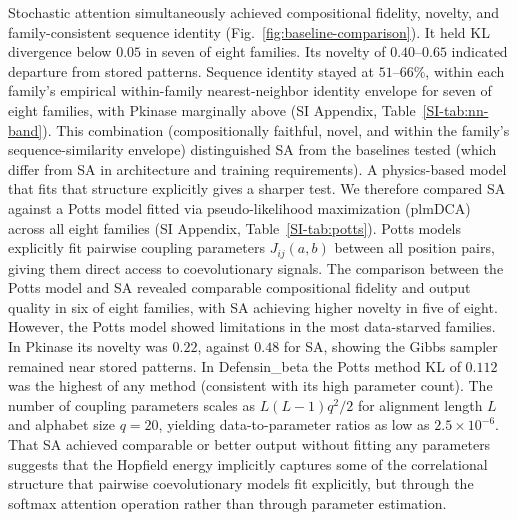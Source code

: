 \documentclass[11pt,onecolumn,twoside,lineno]{pnas-new}
\begin{document}
Stochastic attention simultaneously achieved compositional fidelity, novelty, and family-consistent sequence identity (Fig.~\ref{fig:baseline-comparison}). It held KL divergence below $0.05$ in seven of eight families. Its novelty of $0.40$--$0.65$ indicated departure from stored patterns. Sequence identity stayed at $51$--$66\%$, within each family's empirical within-family nearest-neighbor identity envelope for seven of eight families, with Pkinase marginally above (SI Appendix, Table~\ref{SI-tab:nn-band}). This combination (compositionally faithful, novel, and within the family's sequence-similarity envelope) distinguished SA from the baselines tested (which differ from SA in architecture and training requirements). A physics-based model that fits that structure explicitly gives a sharper test. We therefore compared SA against a Potts model fitted via pseudo-likelihood maximization (plmDCA) across all eight families (SI Appendix, Table~\ref{SI-tab:potts}). Potts models explicitly fit pairwise coupling parameters $J_{ij}(a,b)$ between all position pairs, giving them direct access to coevolutionary signals. The comparison between the Potts model and SA revealed comparable compositional fidelity and output quality in six of eight families, with SA achieving higher novelty in five of eight. However, the Potts model showed limitations in the most data-starved families. In Pkinase its novelty was $0.22$, against $0.48$ for SA, showing the Gibbs sampler remained near stored patterns. In Defensin\_beta the Potts method KL of $0.112$ was the highest of any method (consistent with its high parameter count). The number of coupling parameters scales as $L(L{-}1)q^2/2$ for alignment length $L$ and alphabet size $q{=}20$, yielding data-to-parameter ratios as low as $2.5 \times 10^{-6}$. That SA achieved comparable or better output without fitting any parameters suggests that the Hopfield energy implicitly captures some of the correlational structure that pairwise coevolutionary models fit explicitly, but through the softmax attention operation rather than through parameter estimation.
\end{document}
